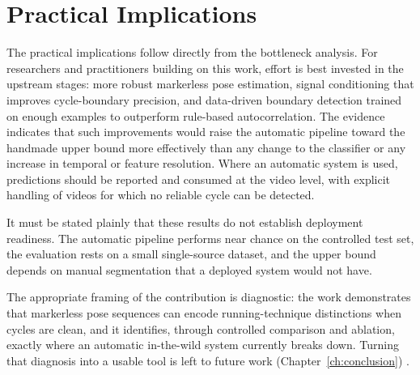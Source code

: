 \section{Practical Implications}
\label{sec:disc-practical}

The practical implications follow directly from the bottleneck analysis. For
researchers and practitioners building on this work, effort is best invested in
the upstream stages: more robust markerless pose estimation, signal conditioning
that improves cycle-boundary precision, and data-driven boundary detection
trained on enough examples to outperform rule-based autocorrelation. The
evidence indicates that such improvements would raise the automatic pipeline
toward the handmade upper bound more effectively than any change to the
classifier or any increase in temporal or feature resolution. Where an
automatic system is used, predictions should be reported and consumed at the
video level, with explicit handling of videos for which no reliable cycle can
be detected.

It must be stated plainly that these results do not establish deployment
readiness. The automatic pipeline performs near chance on the controlled test
set, the evaluation rests on a small single-source dataset, and the upper bound
depends on manual segmentation that a deployed system would not have. 

The
appropriate framing of the contribution is diagnostic: the work demonstrates
that markerless pose sequences can encode running-technique distinctions when
cycles are clean, and it identifies, through controlled comparison and
ablation, exactly where an automatic in-the-wild system currently breaks down.
Turning that diagnosis into a usable tool is left to future work
(Chapter~\ref{ch:conclusion}) .

